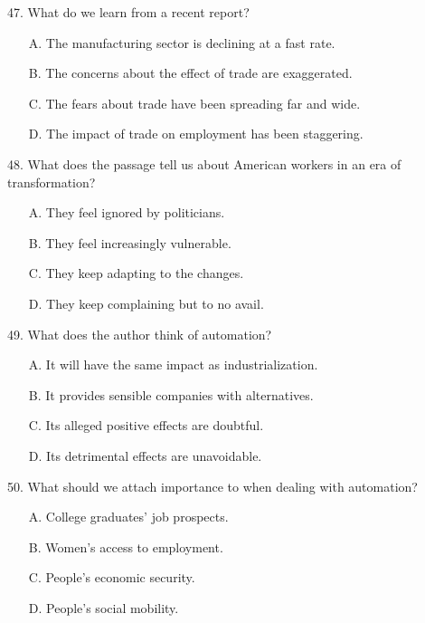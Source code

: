 \documentclass[UTF8,11pt]{ctexart}
\begin{document}
47. What do we learn from a recent report?


\begin{itemize}[leftmargin=2em,itemsep=.2em,topsep=.4em]\item[A.] The manufacturing sector is declining at a fast rate.
\item[B.] The concerns about the effect of trade are exaggerated.
\item[C.] The fears about trade have been spreading far and wide.
\item[D.] The impact of trade on employment has been staggering.
\end{itemize}

48. What does the passage tell us about American workers in an era of transformation?


\begin{itemize}[leftmargin=2em,itemsep=.2em,topsep=.4em]\item[A.] They feel ignored by politicians.
\item[B.] They feel increasingly vulnerable.
\item[C.] They keep adapting to the changes.
\item[D.] They keep complaining but to no avail.
\end{itemize}

49. What does the author think of automation?


\begin{itemize}[leftmargin=2em,itemsep=.2em,topsep=.4em]\item[A.] It will have the same impact as industrialization.
\item[B.] It provides sensible companies with alternatives.
\item[C.] Its alleged positive effects are doubtful.
\item[D.] Its detrimental effects are unavoidable.
\end{itemize}

50. What should we attach importance to when dealing with automation?


\begin{itemize}[leftmargin=2em,itemsep=.2em,topsep=.4em]\item[A.] College graduates' job prospects.
\item[B.] Women's access to employment.
\item[C.] People's economic security.
\item[D.] People's social mobility.
\end{itemize}
\end{document}
